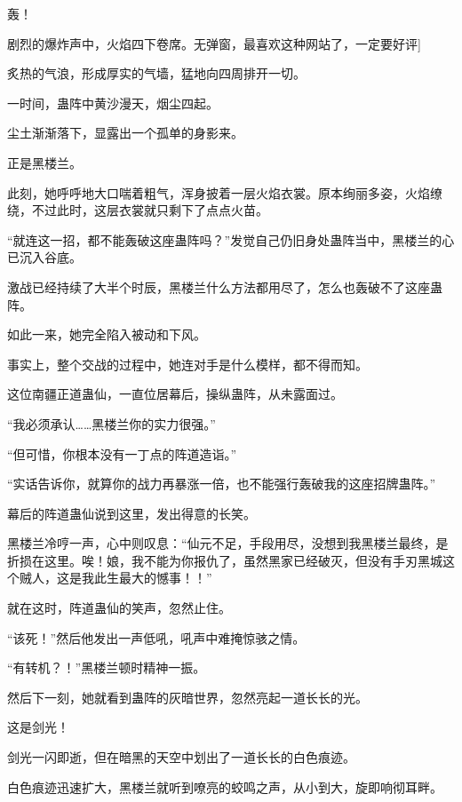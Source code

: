 
\begin{this_body}



轰！

剧烈的爆炸声中，火焰四下卷席。无弹窗，最喜欢这种网站了，一定要好评]

炙热的气浪，形成厚实的气墙，猛地向四周排开一切。

一时间，蛊阵中黄沙漫天，烟尘四起。

尘土渐渐落下，显露出一个孤单的身影来。

正是黑楼兰。

此刻，她呼呼地大口喘着粗气，浑身披着一层火焰衣裳。原本绚丽多姿，火焰缭绕，不过此时，这层衣裳就只剩下了点点火苗。

“就连这一招，都不能轰破这座蛊阵吗？”发觉自己仍旧身处蛊阵当中，黑楼兰的心已沉入谷底。

激战已经持续了大半个时辰，黑楼兰什么方法都用尽了，怎么也轰破不了这座蛊阵。

如此一来，她完全陷入被动和下风。

事实上，整个交战的过程中，她连对手是什么模样，都不得而知。

这位南疆正道蛊仙，一直位居幕后，操纵蛊阵，从未露面过。

“我必须承认……黑楼兰你的实力很强。”

“但可惜，你根本没有一丁点的阵道造诣。”

“实话告诉你，就算你的战力再暴涨一倍，也不能强行轰破我的这座招牌蛊阵。”

幕后的阵道蛊仙说到这里，发出得意的长笑。

黑楼兰冷哼一声，心中则叹息：“仙元不足，手段用尽，没想到我黑楼兰最终，是折损在这里。唉！娘，我不能为你报仇了，虽然黑家已经破灭，但没有手刃黑城这个贼人，这是我此生最大的憾事！！”

就在这时，阵道蛊仙的笑声，忽然止住。

“该死！”然后他发出一声低吼，吼声中难掩惊骇之情。

“有转机？！”黑楼兰顿时精神一振。

然后下一刻，她就看到蛊阵的灰暗世界，忽然亮起一道长长的光。

这是剑光！

剑光一闪即逝，但在暗黑的天空中划出了一道长长的白色痕迹。

白色痕迹迅速扩大，黑楼兰就听到嘹亮的蛟鸣之声，从小到大，旋即响彻耳畔。


\end{this_body}
